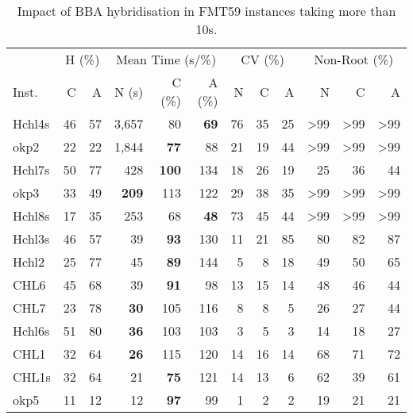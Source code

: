 \documentclass[ppgc,tese,english,formais,babel]{iiufrgs}
\newcommand{\bestcolumnemph}[1]{\textbf{#1}}
\begin{document}
\begin{table}[!ht]
\caption{Impact of BBA hybridisation in FMT59 instances taking more than 10s.}
\label{tab:g2kp_hyb_selected_instances}
\begin{center}
\begin{tabular}{lrrrrrrrrrrr}
\hline\hline
& \multicolumn{2}{c}{H (\%)} & \multicolumn{3}{c}{Mean Time (s/\%)} & \multicolumn{3}{c}{CV (\%)} & \multicolumn{3}{c}{Non-Root (\%)} \\\cmidrule(lr){2-3}\cmidrule(lr){4-6}\cmidrule(lr){7-9}\cmidrule(lr){10-12}
Inst. & C & A & N (s) & C (\%) & A (\%) & N & C & A & N & C & A \\\hline\hline
Hchl4s & 46 & 57 & 3,657 & 80 & \bestcolumnemph{69} & 76 & 35 & 25 & >99 & >99 & >99 \\
okp2 & 22 & 22 & 1,844 & \bestcolumnemph{77} & 88 & 21 & 19 & 44 & >99 & >99 & >99 \\
Hchl7s & 50 & 77 & 428 & \bestcolumnemph{100} & 134 & 18 & 26 & 19 & 25 & 36 & 44 \\
okp3 & 33 & 49 & \bestcolumnemph{209} & 113 & 122 & 29 & 38 & 35 & >99 & >99 & >99 \\
Hchl8s & 17 & 35 & 253 & 68 & \bestcolumnemph{48} & 73 & 45 & 44 & >99 & >99 & >99 \\
Hchl3s & 46 & 57 & 39 & \bestcolumnemph{93} & 130 & 11 & 21 & 85 & 80 & 82 & 87 \\
Hchl2 & 25 & 77 & 45 & \bestcolumnemph{89} & 144 & 5 & 8 & 18 & 49 & 50 & 65 \\
CHL6 & 45 & 68 & 39 & \bestcolumnemph{91} & 98 & 13 & 15 & 14 & 48 & 46 & 44 \\
CHL7 & 23 & 78 & \bestcolumnemph{30} & 105 & 116 & 8 & 8 & 5 & 26 & 27 & 44 \\
Hchl6s & 51 & 80 & \bestcolumnemph{36} & 103 & 103 & 3 & 5 & 3 & 14 & 18 & 27 \\
CHL1 & 32 & 64 & \bestcolumnemph{26} & 115 & 120 & 14 & 16 & 14 & 68 & 71 & 72 \\
CHL1s & 32 & 64 & 21 & \bestcolumnemph{75} & 121 & 14 & 13 & 6 & 62 & 39 & 61 \\
okp5 & 11 & 12 & 12 & \bestcolumnemph{97} & 99 & 1 & 2 & 2 & 19 & 21 & 21 \\\hline\hline
\end{tabular}
\end{center}
\end{table}
\end{document}
